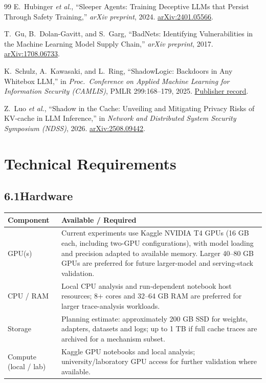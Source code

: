 \documentclass[11pt,a4paper]{article}
\begin{document}
\begin{thebibliography}{99}
 E.~Hubinger \emph{et al.}, ``Sleeper Agents: Training Deceptive LLMs that Persist Through Safety Training,'' \emph{arXiv preprint}, 2024. \href{https://arxiv.org/abs/2401.05566}{arXiv:2401.05566}.

 T.~Gu, B.~Dolan-Gavitt, and S.~Garg, ``BadNets: Identifying Vulnerabilities in the Machine Learning Model Supply Chain,'' \emph{arXiv preprint}, 2017. \href{https://arxiv.org/abs/1708.06733}{arXiv:1708.06733}.

 K.~Schulz, A.~Kawasaki, and L.~Ring, ``ShadowLogic: Backdoors in Any Whitebox LLM,'' in \emph{Proc.\ Conference on Applied Machine Learning for Information Security (CAMLIS)}, PMLR 299:168--179, 2025. \href{https://proceedings.mlr.press/v299/schulz25a.html}{Publisher record}.

 Z.~Luo \emph{et al.}, ``Shadow in the Cache: Unveiling and Mitigating Privacy Risks of KV-cache in LLM Inference,'' in \emph{Network and Distributed System Security Symposium (NDSS)}, 2026. \href{https://arxiv.org/abs/2508.09442}{arXiv:2508.09442}.
\end{thebibliography}


\section{Technical Requirements}

\subsection*{6.1\quad Hardware}
\renewcommand{\arraystretch}{1.6}
\begin{tabularx}{\textwidth}{@{}p{4.0cm}X@{}}
\toprule
\textbf{Component} & \textbf{Available / Required} \\
\midrule
GPU(s) & Current experiments use Kaggle NVIDIA T4 GPUs (16 GB each, including two-GPU configurations), with model loading and precision adapted to available memory. Larger 40--80 GB GPUs are preferred for future larger-model and serving-stack validation. \\
CPU / RAM & Local CPU analysis and run-dependent notebook host resources; 8+ cores and 32--64 GB RAM are preferred for larger trace-analysis workloads. \\
Storage & Planning estimate: approximately 200 GB SSD for weights, adapters, datasets and logs; up to 1 TB if full cache traces are archived for a mechanism subset. \\
Compute (local / lab) & Kaggle GPU notebooks and local analysis; university/laboratory GPU access for further validation where available.\\
\bottomrule
\end{tabularx}
\renewcommand{\arraystretch}{1.0}
\end{document}
